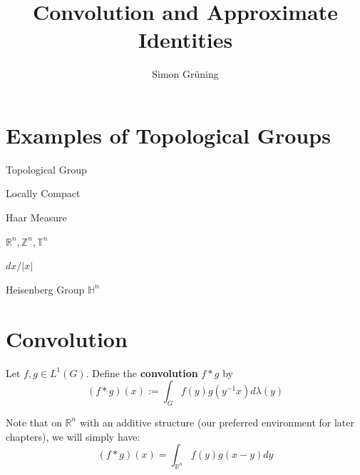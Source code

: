 


\title{Convolution and Approximate Identities}
\author{Simon Gr\"uning}
\address[Simon Gr\"uning]{University of Zurich, R\"{a}mistrasse 71, 8006 Zurich}



\maketitle
\addtocounter{section}{1}

\section{Examples of Topological Groups}



\begin{definition}
Topological Group
\end{definition}

\begin{definition}
Locally Compact
\end{definition}

\begin{definition}
Haar Measure
\end{definition}

	\begin{example}
	$\mathbb{R}^n, \mathbb{Z}^n, \mathbb{T}^n$
	\end{example}
	
\begin{example}
$dx/|x|$
\end{example}	
	
\begin{example}
Heisenberg Group $\mathbb{H}^n$
\end{example}	

	
\section{Convolution}

\begin{definition}
 Let $f,g \in L^1(G)$. Define the \textbf{convolution} $f*g$ by
\begin{equation}
 (f*g)(x) := \int_G f(y)g(y^{-1}x) d\lambda(y)
\end{equation}
\end{definition}

\begin{remark}
Note that on $\mathbb{R}^n$ with an additive structure (our preferred environment for later chapters), we will simply have:
\begin{equation*}
 (f*g)(x) = \int_{\mathbb{R}^n} f(y)g(x-y) dy
\end{equation*}
\end{remark}

